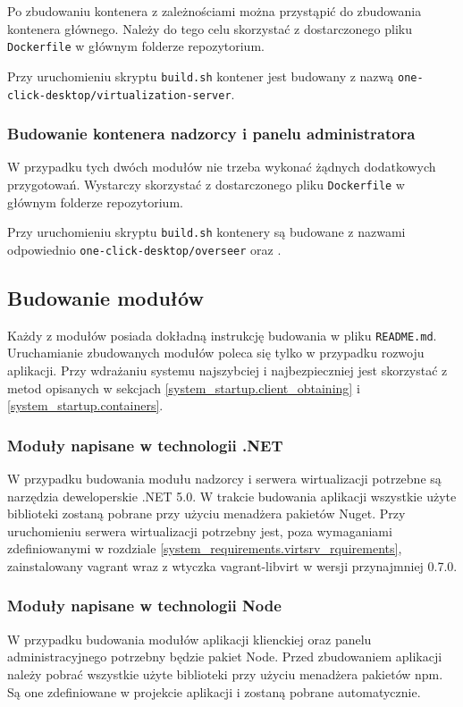 \documentclass[../opis-rozwiazania.tex]{subfiles}
\begin{document}
Po zbudowaniu kontenera z zależnościami można przystąpić do zbudowania kontenera głównego.
Należy do tego celu skorzystać z dostarczonego pliku \texttt{Dockerfile} w głównym folderze repozytorium.

Przy uruchomieniu skryptu \texttt{build.sh} kontener jest budowany z nazwą \texttt{one-click-desktop/virtualization-server}.

\subsubsection{Budowanie kontenera nadzorcy i panelu administratora}
W przypadku tych dwóch modułów nie trzeba wykonać żądnych dodatkowych przygotowań.
Wystarczy skorzystać z dostarczonego pliku \texttt{Dockerfile} w głównym folderze repozytorium.

Przy uruchomieniu skryptu \texttt{build.sh} kontenery są budowane z nazwami odpowiednio \texttt{one-click-desktop/overseer} oraz \texttt{}.

\subsection{Budowanie modułów}
Każdy z modułów posiada dokładną instrukcję budowania w pliku \texttt{README.md}.
Uruchamianie zbudowanych modułów poleca się tylko w przypadku rozwoju aplikacji.
Przy wdrażaniu systemu najszybciej i najbezpieczniej jest skorzystać z metod opisanych w sekcjach \ref{system_startup.client_obtaining} i \ref{system_startup.containers}.

\subsubsection{Moduły napisane w technologii .NET}
W przypadku budowania modułu nadzorcy i serwera wirtualizacji potrzebne są narzędzia deweloperskie .NET 5.0.
W trakcie budowania aplikacji wszystkie użyte biblioteki zostaną pobrane przy użyciu menadżera pakietów Nuget.
Przy uruchomieniu serwera wirtualizacji potrzebny jest, poza wymaganiami zdefiniowanymi w rozdziale \ref{system_requirements.virtsrv_rquirements}, zainstalowany vagrant wraz z wtyczka vagrant-libvirt w wersji przynajmniej 0.7.0.

\subsubsection{Moduły napisane w technologii Node}
W przypadku budowania modułów aplikacji klienckiej oraz panelu administracyjnego potrzebny będzie pakiet Node.
Przed zbudowaniem aplikacji należy pobrać wszystkie użyte biblioteki przy użyciu menadżera pakietów npm.
Są one zdefiniowane w projekcie aplikacji i zostaną pobrane automatycznie.
\end{document}
